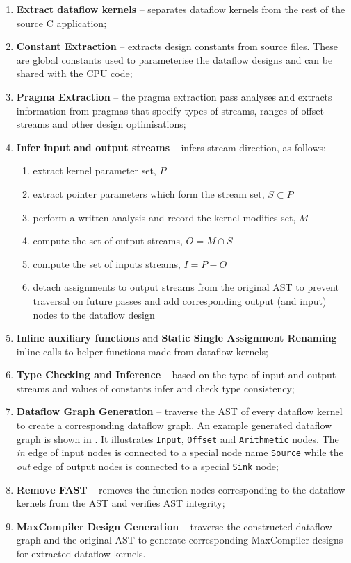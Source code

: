 \begin{enumerate}
\item \textbf{Extract dataflow kernels} -- separates \FAST{} dataflow
  kernels from the rest of the source C application;
\item \textbf{Constant Extraction} -- extracts design constants from
  source files. These are global constants used to parameterise
  the \FAST{} dataflow designs and can be shared with the CPU
  code;
\item \textbf{Pragma Extraction} -- the pragma extraction pass
  analyses and extracts information from pragmas that specify types of
  streams, ranges of offset streams and other design optimisations;
\item \textbf{Infer input and output streams} -- infers stream direction, as follows:
  \begin{enumerate}
  \item extract kernel parameter set, $P$
  \item extract pointer parameters which form the stream set, $ S \subset P $
  \item perform a written analysis and record the kernel modifies set, $M$
  \item compute the set of output streams, $O = M \cap S$
  \item compute the set of inputs streams, $I = P - O$
  \item detach assignments to output streams from the original AST to
    prevent traversal on future passes and add corresponding output (and
    input) nodes to the dataflow design
  \end{enumerate}
\item \textbf{Inline auxiliary functions} and \textbf{Static Single
    Assignment Renaming} -- inline calls to helper functions
  made from \FAST{} dataflow kernels;
\item \textbf{Type Checking and Inference} -- based on the type of
  input and output streams and values of constants infer and check
  type consistency;
\item \textbf{Dataflow Graph Generation} -- traverse the AST of every
  dataflow kernel to create a corresponding dataflow graph. An example
  generated dataflow graph is shown in . It
  illustrates \texttt{Input}, \texttt{Offset} and \texttt{Arithmetic}
  nodes. The \emph{in} edge of input nodes is connected to a special node
  name \texttt{Source} while the \emph{out} edge of output nodes is
  connected to a special \texttt{Sink} node;
\item \textbf{Remove FAST} -- removes the function nodes corresponding
  to the dataflow kernels from the AST and verifies AST integrity;
\item \textbf{MaxCompiler Design Generation} -- traverse the constructed
  dataflow graph and the original AST to generate corresponding MaxCompiler
  designs for extracted dataflow kernels.
\end{enumerate}

